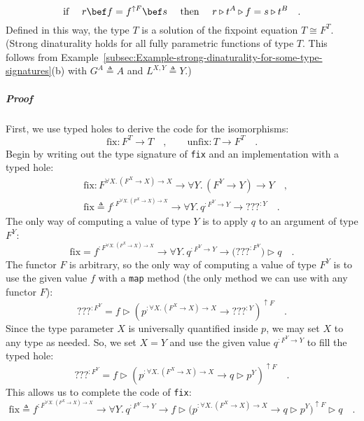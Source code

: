 \begin{equation}
\text{if }\quad r\bef f=f^{\uparrow F}\bef s\quad\text{ then }\quad r\triangleright t^{A}\triangleright f=s\triangleright t^{B}\quad.\label{eq:strong-dinaturality-for-church-encoded-fix-unfix}
\end{equation}
Defined in this way, the type $T$ is a solution of the fixpoint equation
$T\cong F^{T}$. (Strong dinaturality holds for all fully parametric
functions of type $T$. This follows from Example~\ref{subsec:Example-strong-dinaturality-for-some-type-signatures}(b)
with $G^{A}\triangleq A$ and $L^{X,Y}\triangleq Y$.)

\subparagraph{Proof}

First, we use typed holes to derive the code for the isomorphisms:
\[
\text{fix}:F^{T}\rightarrow T\quad,\quad\quad\text{unfix}:T\rightarrow F^{T}\quad.
\]
Begin by writing out the type signature of \lstinline!fix!
and an implementation with a typed hole:
\begin{align*}
 & \text{fix}:F^{\forall X.\,(F^{X}\rightarrow X)\rightarrow X}\rightarrow\forall Y.\,(F^{Y}\rightarrow Y)\rightarrow Y\quad,\\
 & \text{fix}\triangleq f^{:F^{\forall X.\,(F^{X}\rightarrow X)\rightarrow X}}\rightarrow\forall Y.\,q^{:F^{Y}\rightarrow Y}\rightarrow\text{???}^{:Y}\quad.
\end{align*}
The only way of computing a value of type $Y$ is to apply $q$ to
an argument of type $F^{Y}$:
\[
\text{fix}=f^{:F^{\forall X.\,(F^{X}\rightarrow X)\rightarrow X}}\rightarrow\forall Y.\,q^{:F^{Y}\rightarrow Y}\rightarrow\big(\text{???}^{:F^{Y}}\big)\triangleright q\quad.
\]
The functor $F$ is arbitrary, so the only way of computing a value
of type $F^{Y}$ is to use the given value $f$ with a \lstinline!map!
method (the only method we can use with any functor $F$):
\[
\text{???}^{:F^{Y}}=f\triangleright(p^{:\forall X.\,(F^{X}\rightarrow X)\rightarrow X}\rightarrow\text{???}^{:Y})^{\uparrow F}\quad.
\]
Since the type parameter $X$ is universally quantified inside $p$,
we may set $X$ to any type as needed. So, we set $X=Y$ and use the
given value $q^{:F^{Y}\rightarrow Y}$ to fill the typed hole:
\[
\text{???}^{:F^{Y}}=f\triangleright(p^{:\forall X.\,(F^{X}\rightarrow X)\rightarrow X}\rightarrow q\triangleright p^{Y})^{\uparrow F}\quad.
\]
This allows us to complete the code of \lstinline!fix!:
\[
\text{fix}\triangleq f^{:F^{\forall X.\,(F^{X}\rightarrow X)\rightarrow X}}\rightarrow\forall Y.\,q^{:F^{Y}\rightarrow Y}\rightarrow f\triangleright\big(p^{:\forall X.\,(F^{X}\rightarrow X)\rightarrow X}\rightarrow q\triangleright p^{Y}\big)^{\uparrow F}\triangleright q\quad.
\]

